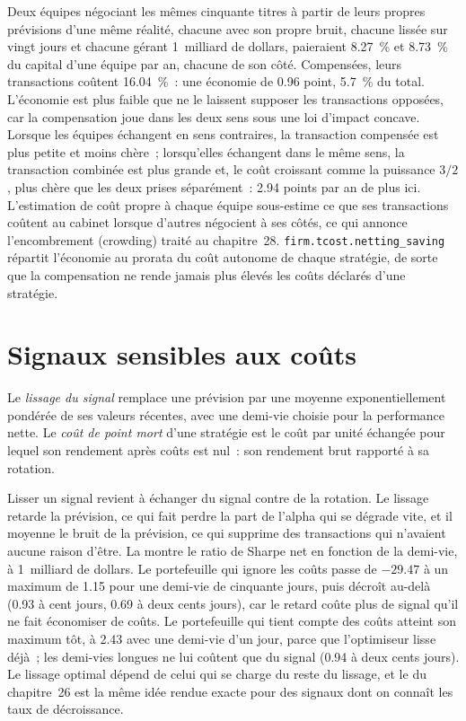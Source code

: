 Deux équipes négociant les mêmes cinquante titres à partir de leurs propres prévisions d'une même réalité, chacune avec son propre bruit, chacune lissée sur vingt jours et chacune gérant
1~milliard de dollars, paieraient 8.27~\% et 8.73~\% du capital d'une équipe par an, chacune de son côté. Compensées, leurs transactions coûtent 16.04~\%~: une économie de 0.96 point, 5.7~\% du total. L'économie
est plus faible que ne le laissent supposer les transactions opposées, car la compensation joue dans les deux sens sous une loi d'impact concave. Lorsque les équipes échangent en sens contraires, la transaction compensée est
plus petite et moins chère~; lorsqu'elles échangent dans le même sens, la transaction combinée est plus grande et, le coût croissant comme la puissance $3/2$, plus chère que les deux prises séparément~: 2.94 points par an
de plus ici. L'estimation de coût propre à chaque équipe sous-estime ce que ses transactions coûtent au cabinet lorsque d'autres négocient à ses côtés, ce qui annonce l'encombrement (crowding) traité au chapitre~28.
\texttt{firm.tcost.netting\_saving} répartit l'économie au prorata du coût autonome de chaque stratégie, de sorte que la compensation ne rende jamais
plus élevés les coûts déclarés d'une stratégie.

\section{Signaux sensibles aux coûts}

\begin{definition}\label{def:rs:transaction-costs-in-research:smoothing}
Le \emph{lissage du signal} remplace une prévision par une moyenne exponentiellement pondérée de ses valeurs récentes, avec une demi-vie choisie pour la
performance nette. Le \emph{coût de point mort} d'une stratégie est le coût par unité échangée pour lequel son rendement après coûts est nul~: son rendement brut
rapporté à sa rotation.
\end{definition}

Lisser un signal revient à échanger du signal contre de la rotation. Le lissage retarde la prévision, ce qui fait perdre la part de l'alpha qui se dégrade vite, et il moyenne le bruit de la prévision, ce qui
supprime des transactions qui n'avaient aucune raison d'être. La  montre le ratio de Sharpe net en fonction de la demi-vie, à 1~milliard de dollars. Le
portefeuille qui ignore les coûts passe de $-29.47$ à un maximum de 1.15 pour une demi-vie de cinquante jours, puis décroît au-delà (0.93 à cent jours, 0.69 à deux cents jours), car le retard coûte plus de
signal qu'il ne fait économiser de coûts. Le portefeuille qui tient compte des coûts atteint son maximum tôt, à 2.43 avec une demi-vie d'un jour, parce que l'optimiseur lisse déjà~; les demi-vies longues ne lui coûtent que du
signal (0.94 à deux cents jours). Le lissage optimal dépend de celui qui se charge du reste du lissage, et le  du chapitre~26 est la même idée rendue exacte
pour des signaux dont on connaît les taux de décroissance.

